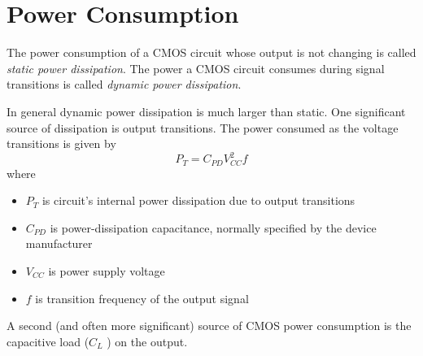 \section{Power Consumption}
The power consumption of a CMOS circuit whose output is not changing is
called \emph{static power dissipation}. 
The power a CMOS circuit consumes during signal transitions is 
called \emph{dynamic power dissipation}.

In general dynamic power dissipation is much larger than static. 
One significant source of dissipation is output transitions. The 
power consumed as the voltage transitions is given by
\begin{equation}
    P_T = C_{PD} V_{CC}^2 f
\end{equation}
where 
\begin{itemize}
    \item $P_T$ is circuit's internal power dissipation due to output transitions
    \item $C_{PD}$ is power-dissipation capacitance, normally specified
    by the device manufacturer
    \item $V_{CC}$ is power supply voltage
    \item $f$ is transition frequency of the output signal
\end{itemize}
A second (and often more significant) source of CMOS power consumption 
is the capacitive load ($C_L$ ) on the output. 